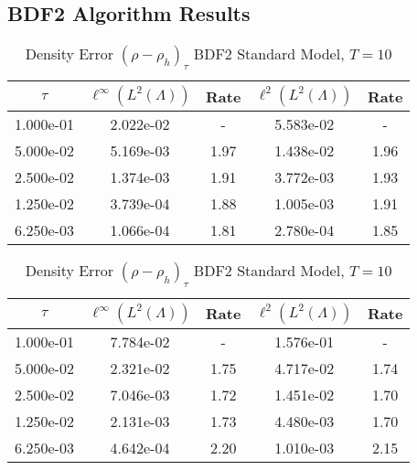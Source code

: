 \documentclass[letterpaper]{erdc}
\begin{document}
\subsection{BDF2 Algorithm Results}
\begin{table}[h!]
  \parbox{.45\linewidth}{
  \tiny
  \centering
    \caption{Density Error $(\rho - \rho_h)_{\tau}$ BDF2 Rotational Model, $T=10$}
    \begin{tabular}{c|c|c|c|c}
      $\tau$  & $\ell^{\infty}\left(L^2(\Lambda)\right)$ &  Rate  &  $\ell^2\left(L^2(\Lambda)\right)$  &  Rate\\
      \hline
      1.000e-01 & 2.022e-02 &  -   & 5.583e-02 &  -  \\
      5.000e-02 & 5.169e-03 & 1.97 & 1.438e-02 & 1.96\\
      2.500e-02 & 1.374e-03 & 1.91 & 3.772e-03 & 1.93\\
      1.250e-02 & 3.739e-04 & 1.88 & 1.005e-03 & 1.91\\
      6.250e-03 & 1.066e-04 & 1.81 & 2.780e-04 & 1.85
    \end{tabular}
    }
    \hfill
    \parbox{.45\linewidth}{
    \tiny
    \centering
      \caption{Density Error $(\rho - \rho_h)_{\tau}$ BDF2 Standard Model, $T=10$}
      \begin{tabular}{c|c|c|c|c}
        $\tau$  & $\ell^{\infty}\left(L^2(\Lambda)\right)$ &  Rate  &  $\ell^2\left(L^2(\Lambda)\right)$  &  Rate\\
        \hline
        1.000e-01 & 7.784e-02 &   -  & 1.576e-01 &   - \\
        5.000e-02 & 2.321e-02 & 1.75 & 4.717e-02 & 1.74\\
        2.500e-02 & 7.046e-03 & 1.72 & 1.451e-02 & 1.70\\
        1.250e-02 & 2.131e-03 & 1.73 & 4.480e-03 & 1.70\\
        6.250e-03 & 4.642e-04 & 2.20 & 1.010e-03 & 2.15
      \end{tabular}
    }
\end{table}
\end{document}
